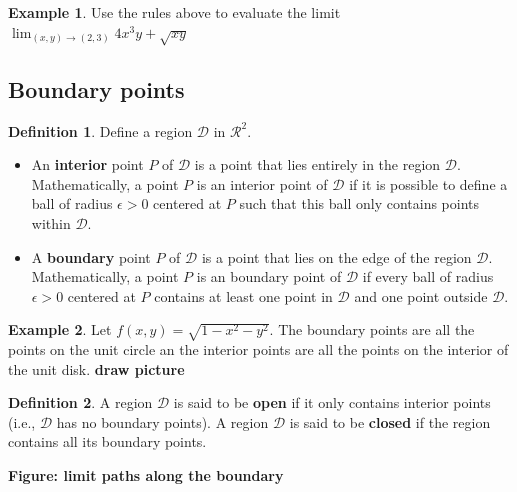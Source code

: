 \documentclass[
]{book}
\theoremstyle{definition}
\newtheorem{definition}{Definition}[chapter]
\theoremstyle{definition}
\newtheorem{example}{Example}[chapter]
\theoremstyle{definition}
\theoremstyle{definition}
\theoremstyle{remark}
\begin{document}
\begin{example}
Use the rules above to evaluate the limit \(\lim_{(x, y) \rightarrow (2, 3)} 4x^3y + \sqrt{xy}\)
\end{example}

\hypertarget{boundary-points}{%
\subsection{Boundary points}\label{boundary-points}}

\begin{definition}

Define a region \(\mathcal{D}\) in \(\mathcal{R}^2\).

\begin{itemize}
\item
  An \textbf{interior} point \(P\) of \(\mathcal{D}\) is a point that lies entirely in the region \(\mathcal{D}\). Mathematically, a point \(P\) is an interior point of \(\mathcal{D}\) if it is possible to define a ball of radius \(\epsilon>0\) centered at \(P\) such that this ball only contains points within \(\mathcal{D}\).
\item
  A \textbf{boundary} point \(P\) of \(\mathcal{D}\) is a point that lies on the edge of the region \(\mathcal{D}\). Mathematically, a point \(P\) is an boundary point of \(\mathcal{D}\) if every ball of radius \(\epsilon>0\) centered at \(P\) contains at least one point in \(\mathcal{D}\) and one point outside \(\mathcal{D}\).
\end{itemize}

\end{definition}

\begin{example}
Let \(f(x, y) = \sqrt{1 - x^2 - y^2}\). The boundary points are all the points on the unit circle an the interior points are all the points on the interior of the unit disk. \textbf{draw picture}
\end{example}

\begin{definition}
A region \(\mathcal{D}\) is said to be \textbf{open} if it only contains interior points (i.e., \(\mathcal{D}\) has no boundary points). A region \(\mathcal{D}\) is said to be \textbf{closed} if the region contains all its boundary points.
\end{definition}

\textbf{Figure: limit paths along the boundary}
\end{document}
